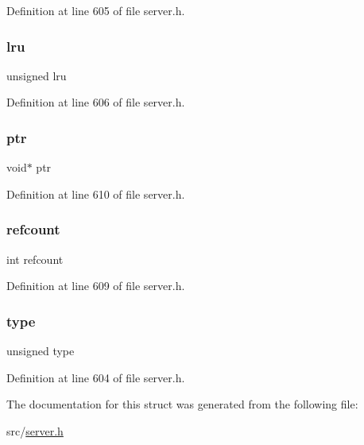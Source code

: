 Definition at line 605 of file server.\+h.

\mbox{\label{structredis_object_abe5aec51795e89d8bdaf84d58d8eb00a}} 
\subsubsection{\texorpdfstring{lru}{lru}}
{\footnotesize\ttfamily unsigned lru}



Definition at line 606 of file server.\+h.

\mbox{\label{structredis_object_add9af9569af79ec26dd741fb226b38ba}} 
\subsubsection{\texorpdfstring{ptr}{ptr}}
{\footnotesize\ttfamily void$\ast$ ptr}



Definition at line 610 of file server.\+h.

\mbox{\label{structredis_object_a6022c8a609170c7365fb96e83cb2df48}} 
\subsubsection{\texorpdfstring{refcount}{refcount}}
{\footnotesize\ttfamily int refcount}



Definition at line 609 of file server.\+h.

\mbox{\label{structredis_object_afa65f328561a1fb0d243d9be5d7f37dd}} 
\subsubsection{\texorpdfstring{type}{type}}
{\footnotesize\ttfamily unsigned type}



Definition at line 604 of file server.\+h.



The documentation for this struct was generated from the following file\+:\begin{DoxyCompactItemize}
\item 
src/\hyperlink{server_8h}{server.\+h}\end{DoxyCompactItemize}
